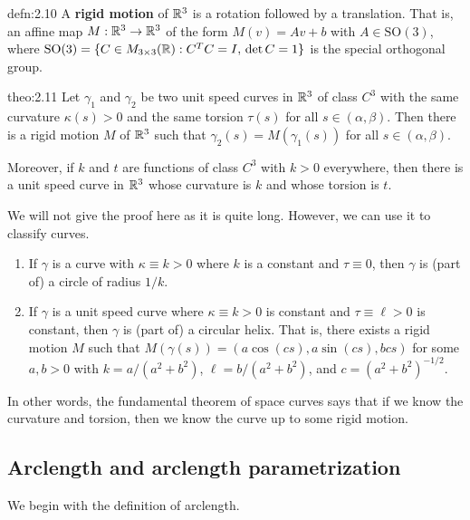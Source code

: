\begin{defn}{defn:2.10}
    A {\bf rigid motion} of $\mathbb{R}^3$ is a rotation followed by a translation. 
    That is, an affine map $M : \mathbb{R}^3 \to \mathbb{R}^3$ of the form $M(v) = Av + b$
    with $A \in \text{SO}(3)$, where $\text{SO}(3) = \{C \in M_{3\times 3}(\mathbb{R}) 
    : C^TC = I,\, \det C = 1\}$ is the special orthogonal group.
\end{defn}\vspace{-0.25cm}

\begin{theo}{theo:2.11}
    Let $\gamma_1$ and $\gamma_2$ be two unit speed curves in $\mathbb{R}^3$ 
    of class $C^3$ with the same curvature $\kappa(s) > 0$ 
    and the same torsion $\tau(s)$ for all $s \in (\alpha, \beta)$. 
    Then there is a rigid motion $M$ of $\mathbb{R}^3$ such that 
    $\gamma_2(s) = M(\gamma_1(s))$ for all $s \in (\alpha, \beta)$.

    Moreover, if $k$ and $t$ are functions of class $C^3$ with $k > 0$ 
    everywhere, then there is a unit speed curve in $\mathbb{R}^3$ whose curvature 
    is $k$ and whose torsion is $t$. 
\end{theo}\vspace{-0.25cm}

We will not give the proof here as it is quite long. However, we can 
use it to classify curves. 
\begin{enumerate}[(1)]
    \item If $\gamma$ is a curve with $\kappa \equiv k > 0$ where $k$ is a 
    constant and $\tau \equiv 0$, then $\gamma$ is (part of) a circle of 
    radius $1/k$. 
    \item If $\gamma$ is a unit speed curve where $\kappa \equiv k > 0$ 
    is constant and $\tau \equiv \ell > 0$ is constant, then 
    $\gamma$ is (part of) a circular helix. That is, there exists a rigid 
    motion $M$ such that $M(\gamma(s)) = (a\cos(cs), a\sin(cs), bcs)$ 
    for some $a, b > 0$ with $k = a/(a^2+b^2)$, $\ell = b/(a^2+b^2)$, 
    and $c = (a^2+b^2)^{-1/2}$.
\end{enumerate}
In other words, the fundamental theorem of space curves says that 
if we know the curvature and torsion, then we know the curve up to 
some rigid motion.

\subsection{Arclength and arclength parametrization} \label{subsec:2.4}
We begin with the definition of arclength. 

